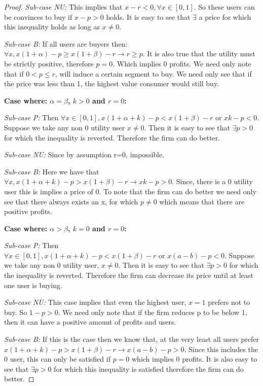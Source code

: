 \documentclass{article}
\begin{document}
\begin{proof}
\textit{Sub-case NU:} This implies that $x-r<0, \forall x \in [0,1]$. So these users can be convinces to buy if $x-p>0$ holds. It is easy to see that $\exists$ a price for which this inequality holds as long as $x \neq 0$.

\textit{Sub-case B:} If all users are buyers then: $ \forall x, x(1+\alpha)-p \geq x(1+\beta)-r \rightarrow r \geq p$. It is also true that the utility must be strictly positive, therefore $p=0$. Which implies 0 profits. We need only note that if $0<p \leq r$, will induce a certain segment to buy. We need only see that if the price was less than 1, the highest value consumer would still buy. 


\textbf{Case where: $\alpha = \beta$, $k > 0$ and $r=0$:}

\textit{Sub-case P:}
Then $\forall x \in [0,1], x(1+\alpha+k)-p<x(1+\beta)-r \text{ or } xk-p<0$. Suppose we take any non 0 utility user $x \neq 0$. Then it is easy to see that $\exists p>0$ for which the inequality is reverted. Therefore the firm can do better. 

\textit{Sub-case NU:}
Since by assumption r=0, impossible. 

\textit{Sub-case B:}
Here we have that $\forall x, x(1+\alpha+k)-p>x(1+\beta)-r \rightarrow xk-p>0$. Since, there is a 0 utility user this is implies a price of 0. To note that the firm can do better we need only see that there always exists an x, for which $p \neq 0$ which means that there are positive profits. 


\textbf{Case where: $\alpha > \beta$, $k = 0$ and $r=0$:}


\textit{Sub-case P:}
Then $\forall x \in [0,1], x(1+\alpha+k)-p<x(1+\beta)-r \text{ or } x(a-b)-p<0$. Suppose we take any non 0 utility user, $x \neq 0$. Then it is easy to see that $\exists p>0$ for which the inequality is reverted. Therefore the firm can decrease its price until at least one user is buying. 

\textit{Sub-case NU:}
This case implies that even the highest user, $x=1$ prefers not to buy. So $1-p>0$. We need only note that if the firm reduces p to be below 1, then it can have a positive amount of profits and users. 

\textit{Sub-case B:}
If this is the case then we know that, at the very least all users prefer $x(1+\alpha+k)-p>x(1+\beta)-r \rightarrow x(a-b)-p>0$. Since this includes the 0 user, this can only be satisfied if $p=0$ which implies 0 profits. It is also easy to see that $\exists p>0$ for which this inequality is satisfied therefore the firm can do better.
\end{proof} 
\end{document}
